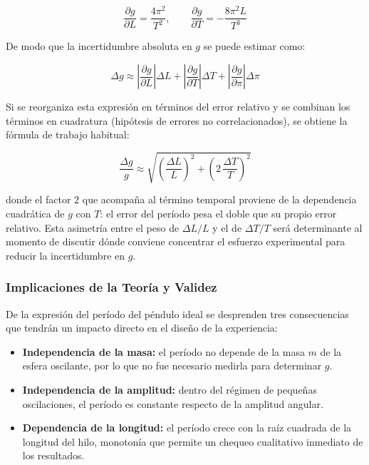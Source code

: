 \begin{equation}
    \frac{\partial g}{\partial L} = \frac{4\pi^2}{T^2},
    \qquad
    \frac{\partial g}{\partial T} = -\frac{8\pi^2 L}{T^3}
\end{equation}

De modo que la incertidumbre absoluta en $g$ se puede estimar como:

\begin{equation}
    \Delta g \approx \left|\frac{\partial g}{\partial L}\right| \Delta L + \left|\frac{\partial g}{\partial T}\right| \Delta T + \left|\frac{\partial g}{\partial \pi}\right| \Delta \pi
\end{equation}

Si se reorganiza esta expresión en términos del error relativo y se combinan los términos en cuadratura (hipótesis de errores no correlacionados), se obtiene la fórmula de trabajo habitual:

\begin{equation}
    \frac{\Delta g}{g} \approx \sqrt{\left(\frac{\Delta L}{L}\right)^2 + \left(2\,\frac{\Delta T}{T}\right)^2}
    \label{eq:propagacion_g}
\end{equation}

donde el factor $2$ que acompaña al término temporal proviene de la dependencia cuadrática de $g$ con $T$: el error del período pesa el doble que su propio error relativo. Esta asimetría entre el peso de $\Delta L/L$ y el de $\Delta T/T$ será determinante al momento de discutir dónde conviene concentrar el esfuerzo experimental para reducir la incertidumbre en $g$.

\subsubsection{Implicaciones de la Teoría y Validez}

De la expresión del período del péndulo ideal se desprenden tres consecuencias que tendrán un impacto directo en el diseño de la experiencia:

\begin{itemize}
    \item \textbf{Independencia de la masa:} el período no depende de la masa $m$ de la esfera oscilante, por lo que no fue necesario medirla para determinar $g$.

    \item \textbf{Independencia de la amplitud:} dentro del régimen de pequeñas oscilaciones, el período es constante respecto de la amplitud angular.

    \item \textbf{Dependencia de la longitud:} el período crece con la raíz cuadrada de la longitud del hilo, monotonía que permite un chequeo cualitativo inmediato de los resultados.
\end{itemize}

